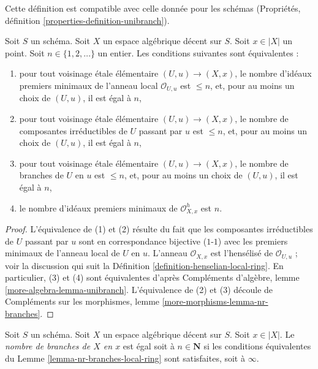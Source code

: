 \noindent
Cette définition est compatible avec celle donnée pour les schémas
(Propriétés, définition \ref{properties-definition-unibranch}).

\begin{lemma}
\label{lemma-nr-branches-local-ring}
Soit $S$ un schéma. Soit $X$ un espace algébrique décent sur $S$.
Soit $x \in |X|$ un point. Soit $n \in \{1, 2, \ldots\}$ un entier.
Les conditions suivantes sont équivalentes :
\begin{enumerate}
\item pour tout voisinage étale élémentaire $(U, u) \to (X, x)$, le nombre
d'idéaux premiers minimaux de l'anneau local $\mathcal{O}_{U, u}$ est
$\leq n$, et, pour au moins un choix de $(U, u)$, il est égal à $n$,
\item pour tout voisinage étale élémentaire $(U, u) \to (X, x)$, le nombre
de composantes irréductibles de $U$ passant par $u$ est $\leq n$, et, pour
au moins un choix de $(U, u)$, il est égal à $n$,
\item pour tout voisinage étale élémentaire $(U, u) \to (X, x)$, le nombre
de branches de $U$ en $u$ est $\leq n$, et, pour au moins un choix de
$(U, u)$, il est égal à $n$,
\item le nombre d'idéaux premiers minimaux de
$\mathcal{O}_{X, x}^h$ est $n$.
\end{enumerate}
\end{lemma}

\begin{proof}
L'équivalence de (1) et (2) résulte du fait que les composantes irréductibles
de $U$ passant par $u$ sont en correspondance bijective ($1$-$1$) avec les
premiers minimaux de l'anneau local de $U$ en $u$.
L'anneau $\mathcal{O}_{X, x}$ est l'hensélisé de $\mathcal{O}_{U, u}$ ;
voir la discussion qui suit la
Définition \ref{definition-henselian-local-ring}.
En particulier, (3) et (4) sont équivalentes d'après Compléments d'algèbre,
lemme \ref{more-algebra-lemma-unibranch}.
L'équivalence de (2) et (3) découle de Compléments sur les morphismes, lemme
\ref{more-morphisms-lemma-nr-branches}.
\end{proof}

\begin{definition}
\label{definition-number-of-branches}
Soit $S$ un schéma. Soit $X$ un espace algébrique décent sur $S$.
Soit $x \in |X|$. Le {\it nombre de branches de $X$ en $x$} est égal soit à
$n \in \mathbf{N}$ si les conditions équivalentes du
Lemme \ref{lemma-nr-branches-local-ring} sont satisfaites, soit à $\infty$.
\end{definition}






